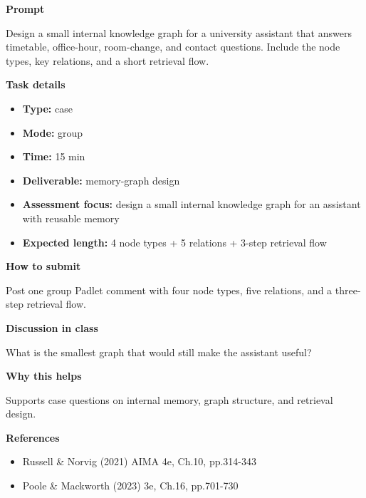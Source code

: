 \documentclass[11pt]{article}
\begin{document}
\begin{tcolorbox}[colback=white,colframe=MidnightBlue,title={Q5 Collaborative Mini-Case},fonttitle=\bfseries,breakable]
\begin{center}
\end{center}

{\large\bfseries\color{MidnightBlue} Prompt}\par\medskip
Design a small internal knowledge graph for a university assistant that answers timetable, office-hour, room-change, and contact questions. Include the node types, key relations, and a short retrieval flow.

{\large\bfseries\color{MidnightBlue} Task details}\par\medskip
\begin{itemize}\item \textbf{Type:} case
\item \textbf{Mode:} group
\item \textbf{Time:} 15 min
\item \textbf{Deliverable:} memory-graph design
\item \textbf{Assessment focus:} design a small internal knowledge graph for an assistant with reusable memory
\item \textbf{Expected length:} 4 node types + 5 relations + 3-step retrieval flow\end{itemize}

{\large\bfseries\color{MidnightBlue} How to submit}\par\medskip
Post one group Padlet comment with four node types, five relations, and a three-step retrieval flow.

{\large\bfseries\color{MidnightBlue} Discussion in class}\par\medskip
What is the smallest graph that would still make the assistant useful?

{\large\bfseries\color{MidnightBlue} Why this helps}\par\medskip
Supports case questions on internal memory, graph structure, and retrieval design.

{\large\bfseries\color{MidnightBlue} References}\par\medskip
\begin{itemize}\item Russell \& Norvig (2021) AIMA 4e, Ch.10, pp.314-343
\item Poole \& Mackworth (2023) 3e, Ch.16, pp.701-730\end{itemize}
\end{tcolorbox}
\end{document}
